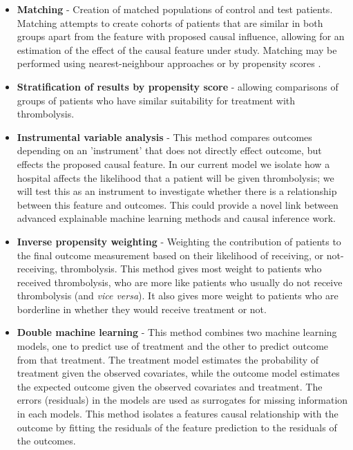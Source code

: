 \begin{itemize}
    \item \textbf{Matching} - Creation of matched populations of control and test patients. Matching attempts to create cohorts of patients that are similar in both groups apart from the feature with proposed causal influence, allowing for an estimation of the effect of the causal feature under study. Matching may be performed using nearest-neighbour approaches \cite{stuart_matching_2010} or by propensity scores \cite{rosenbaum_central_1983}.

    \item \textbf{Stratification of results by propensity score} \cite{rosenbaum_central_1983} - allowing comparisons of groups of patients who have similar suitability for treatment with thrombolysis.

    \item \textbf{Instrumental variable analysis} \cite{stel_instrumental_2013} - This method compares outcomes depending on an 'instrument' that does not directly effect outcome, but effects the proposed causal feature. In our current model we isolate how a hospital affects the likelihood that a patient will be given thrombolysis; we will test this as an instrument to investigate whether there is a relationship between this feature and outcomes. This could provide a novel link between advanced explainable machine learning methods and causal inference work.
           
    \item \textbf{Inverse propensity weighting} \cite{glynn_introduction_2010} - Weighting the contribution of patients to the final outcome measurement based on their likelihood of receiving, or not-receiving, thrombolysis. This method gives most weight to patients who received thrombolysis, who are more like patients who usually do not receive thrombolysis (and \textit{vice versa}). It also gives more weight to patients who are borderline in whether they would receive treatment or not.   
       
    \item \textbf{Double machine learning} \cite{chernozhukov_doubledebiased_2017} - This method combines two machine learning models, one to predict use of treatment and the other to predict outcome from that treatment. The treatment model estimates the probability of treatment given the observed covariates, while the outcome model estimates the expected outcome given the observed covariates and treatment. The errors (residuals) in the models are used as surrogates for missing information in each models. This method isolates a features causal relationship with the outcome by fitting the residuals of the feature prediction to the residuals of the outcomes.
\end{itemize}

